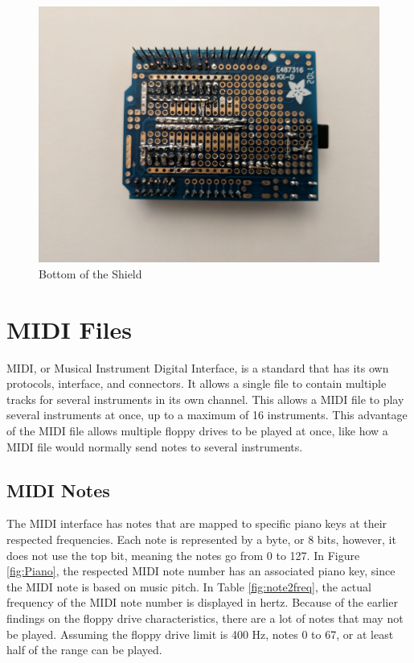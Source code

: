 \documentclass[11pt, a4paper]{report}
\begin{document}
\begin{figure}[H]
\hspace*{-2cm}    
    \centering
    \includegraphics[width=.3\textwidth]{BOT.jpg}
    \caption{Bottom of the Shield}
    \label{fig:BOT}
\end{figure}



\chapter{MIDI Files}

MIDI, or Musical Instrument Digital Interface, is a standard that has its own protocols, interface, and connectors. It allows a single file to contain multiple tracks for several instruments in its own channel. This allows a MIDI file to play several instruments at once, up to a maximum of 16 instruments. This advantage of the MIDI file allows multiple floppy drives to be played at once, like how a MIDI file would normally send notes to several instruments. 

\section{MIDI Notes}

The MIDI interface has notes that are mapped to specific piano keys at their respected frequencies. Each note is represented by a byte, or 8 bits, however, it does not use the top bit, meaning the notes go from 0 to 127. In Figure \ref{fig:Piano}, the respected MIDI note number has an associated piano key, since the MIDI note is based on music pitch. In Table \ref{fig:note2freq}, the actual frequency of the MIDI note number is displayed in hertz. Because of the earlier findings on the floppy drive characteristics, there are a lot of notes that may not be played. Assuming the floppy drive limit is 400 Hz, notes 0 to 67, or at least half of the range can be played. 
\end{document}
